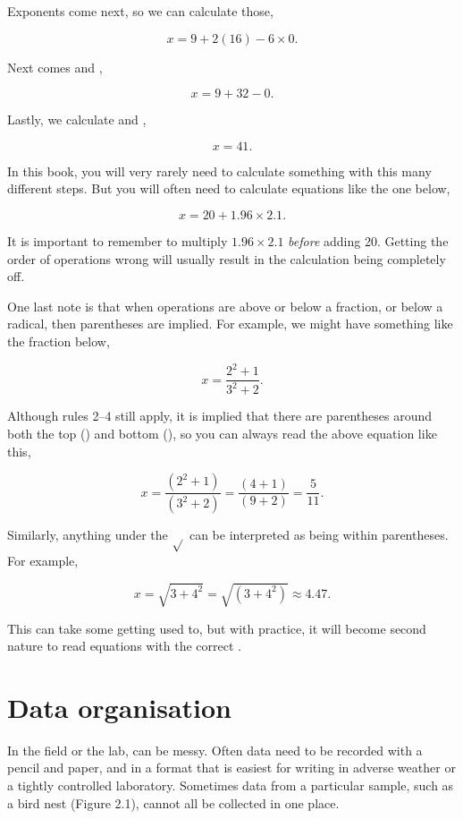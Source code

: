 \documentclass[
  openany]{krantz}
\begin{document}
Exponents come next, so we can calculate those,

\[x = 9 + 2\left(16\right) - 6 \times 0.\]

Next comes  and ,

\[x = 9 + 32 -  0.\]

Lastly, we calculate  and ,

\[x = 41.\]

In this book, you will very rarely need to calculate something with this many different steps.
But you will often need to calculate equations like the one below,

\[x = 20 + 1.96 \times 2.1.\]

It is important to remember to multiply \(1.96 \times 2.1\) \emph{before} adding 20.
Getting the order of operations wrong will usually result in the calculation being completely off.

One last note is that when operations are above or below a fraction, or below a radical, then parentheses are implied.
For example, we might have something like the fraction below,

\[x = \frac{2^{2} + 1}{3^{2} +2}.\]

Although rules 2--4 still apply, it is implied that there are parentheses around both the top () and bottom (), so you can always read the above equation like this,

\[x = \frac{\left(2^{2} + 1\right)}{\left(3^{2} + 2\right)} = \frac{\left(4 + 1\right)}{\left(9 + 2\right)} = \frac{5}{11}.\]

Similarly, anything under the \(\sqrt{}\) can be interpreted as being within parentheses.
For example,

\[x = \sqrt{3 + 4^{2}} = \sqrt{\left(3 + 4^{2} \right)} \approx 4.47.\]

This can take some getting used to, but with practice, it will become second nature to read equations with the correct .

\hypertarget{Chapter_2}{%
\chapter{Data organisation}\label{Chapter_2}}

In the field or the lab,  can be messy.
Often data need to be recorded with a pencil and paper, and in a format that is easiest for writing in adverse weather or a tightly controlled laboratory.
Sometimes data from a particular sample, such as a bird nest (Figure 2.1), cannot all be collected in one place.
\end{document}

